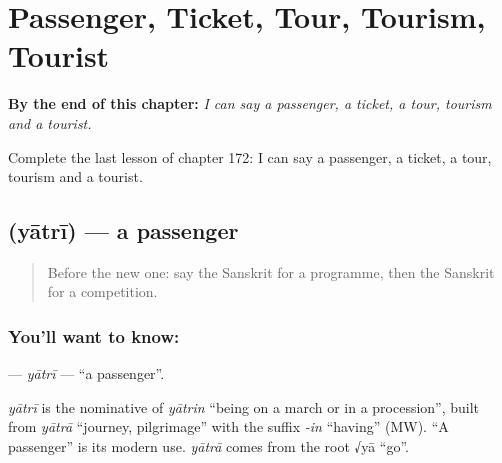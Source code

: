 
\chapter{Passenger, Ticket, Tour, Tourism, Tourist}
\label{ch:sa-passenger-ticket-tour-tourism-tourist}

\begin{chapteropening}
\textbf{By the end of this chapter:} \emph{I can say a passenger, a ticket, a tour, tourism and a tourist.}

Complete the last lesson of chapter 172: I can say a passenger, a ticket, a tour, tourism and a tourist.
\end{chapteropening}

\section[\texorpdfstring{\sk{यात्री} (yātrī)}{यात्री (yātrī)}]{ (yātrī) — a passenger}

\label{lesson:SA-C172-yatri}



\begin{quote}
Before the new one: say the Sanskrit for a programme, then the Sanskrit for a competition.
\end{quote}

\subsection*{You'll want to know: }
\textbf{} — \emph{yātrī} — \textquotedblleft{}a passenger\textquotedblright{}.

\begin{cousinweb}
\emph{yātrī} is the nominative of \emph{yātrin} \textquotedblleft{}being on a march or in a procession\textquotedblright{}, built from \emph{yātrā} \textquotedblleft{}journey, pilgrimage\textquotedblright{} with the suffix \emph{-in} \textquotedblleft{}having\textquotedblright{} (MW). \textquotedblleft{}A passenger\textquotedblright{} is its modern use. \emph{yātrā} comes from the root √yā \textquotedblleft{}go\textquotedblright{}.
\end{cousinweb}

